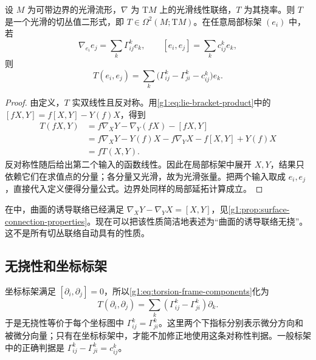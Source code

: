 \begin{proposition}\label{g1:prop:torsion-tensorial}
	设 \(M\) 为可带边界的光滑流形，\(\nabla\) 为 \(\mathrm{T}M\) 上的光滑线性联络，\(T\) 为其挠率。则 \(T\) 是一个光滑的切丛值二形式，即 \(T\in\Omega^2(M;\mathrm{T}M)\)。在任意局部标架 \((e_i)\) 中，若
	\[
		\nabla_{e_i}e_j=\sum_k\Gamma^k_{ij}e_k,\qquad
		[e_i,e_j]=\sum_k c^k_{ij}e_k,
	\]
	则
	\begin{equation}\label{g1:eq:torsion-frame-components}
		T(e_i,e_j)=\sum_k\bigl(\Gamma^k_{ij}-\Gamma^k_{ji}-c^k_{ij}\bigr)e_k.
	\end{equation}
\end{proposition}
\begin{proof}
	由定义，\(T\) 实双线性且反对称。用\eqref{g1:eq:lie-bracket-product}中的 \([fX,Y]=f[X,Y]-Y(f)X\)，得到
	\begin{align*}
		T(fX,Y)
		&=f\nabla_XY-\nabla_Y(fX)-[fX,Y]\\
		&=f\nabla_XY-Y(f)X-f\nabla_YX-f[X,Y]+Y(f)X\\
		&=fT(X,Y).
	\end{align*}
	反对称性随后给出第二个输入的函数线性。因此在局部标架中展开 \(X,Y\)，结果只依赖它们在求值点的分量；各分量又光滑，故为光滑张量。把两个输入取成 \(e_i,e_j\)，直接代入定义便得分量公式。边界处同样的局部延拓计算成立。
\end{proof}

在中，曲面的诱导联络已经满足 \(\nabla_XY-\nabla_YX=[X,Y]\)，见\cref{g1:prop:surface-connection-properties}。现在可以把该性质简洁地表述为“曲面的诱导联络无挠”。这不是所有切丛联络自动具有的性质。

\subsection{无挠性和坐标标架}
\label{g1:subsec:1504:02}

坐标标架满足 \([\partial_i,\partial_j]=0\)，所以\eqref{g1:eq:torsion-frame-components}化为
\[
	T(\partial_i,\partial_j)=\sum_k(\Gamma^k_{ij}-\Gamma^k_{ji})\partial_k.
\]
于是无挠性等价于每个坐标图中 \(\Gamma^k_{ij}=\Gamma^k_{ji}\)。这里两个下指标分别表示微分方向和被微分向量；只有在坐标标架中，才能不加修正地使用这条对称性判据。一般标架中的正确判据是 \(\Gamma^k_{ij}-\Gamma^k_{ji}=c^k_{ij}\)。

